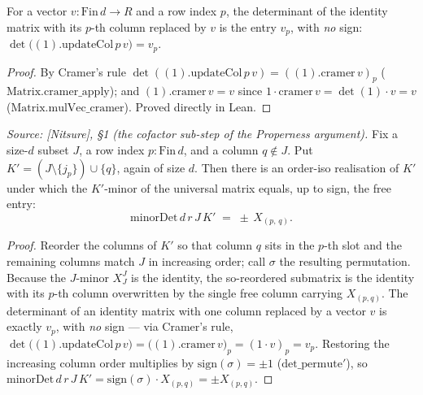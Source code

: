 \begin{lemma}\leanok
  \label{lem:gr_det_one_updateCol}
  For a vector \(v : \mathrm{Fin}\,d \to R\) and a row index \(p\), the determinant of the identity
  matrix with its \(p\)-th column replaced by \(v\) is the entry \(v_p\), with \emph{no} sign:
  \(\det\bigl((1).\mathrm{updateCol}\,p\,v\bigr) = v_p\).
\end{lemma}
\begin{proof}

\leanok
  By Cramer's rule \(\det((1).\mathrm{updateCol}\,p\,v) = ((1).\mathrm{cramer}\,v)_p\)
  (\(\mathrm{Matrix.cramer\_apply}\)); and \((1).\mathrm{cramer}\,v = v\) since
  \(\mathrm{1}\cdot\mathrm{cramer}\,v = \det(1)\cdot v = v\) (\(\mathrm{Matrix.mulVec\_cramer}\)).
  Proved directly in Lean.
\end{proof}

\begin{lemma}\leanok
  \label{lem:gr_free_entry_eq_signed_minor}
  \textit{Source: [Nitsure], \S 1 (the cofactor sub-step of the Properness argument).}
  Fix a size-\(d\) subset \(J\), a row index \(p : \mathrm{Fin}\,d\), and a column \(q \notin J\). Put
  \(K' = (J \setminus \{j_p\}) \cup \{q\}\), again of size \(d\). Then there is an order-iso realisation of
  \(K'\) under which the \(K'\)-minor of the universal matrix equals, up to sign, the free entry:
  \[
    \mathrm{minorDet}\,d\,r\,J\,K' \;=\; \pm\, X_{(p,\,q)} .
  \]
\end{lemma}
\begin{proof}
  \leanok
  Reorder the columns of \(K'\) so that column \(q\) sits in the \(p\)-th slot and the remaining columns
  match \(J\) in increasing order; call \(\sigma\) the resulting permutation. Because the \(J\)-minor
  \(X^J_J\) is the identity, the so-reordered submatrix is the identity with its \(p\)-th column overwritten
  by the single free column carrying \(X_{(p,q)}\). The determinant of an identity matrix with one column
  replaced by a vector \(v\) is exactly \(v_p\), with \emph{no} sign --- via Cramer's rule,
  \(\det\bigl((1).\mathrm{updateCol}\,p\,v\bigr) = \bigl((1).\mathrm{cramer}\,v\bigr)_p
  = (\mathrm{1}\cdot v)_p = v_p\). Restoring the increasing column order multiplies by \(\mathrm{sign}(\sigma)
  = \pm 1\) (\(\mathrm{det\_permute}'\)), so \(\mathrm{minorDet}\,d\,r\,J\,K' = \mathrm{sign}(\sigma)\cdot
  X_{(p,q)} = \pm X_{(p,q)}\).
\end{proof}

